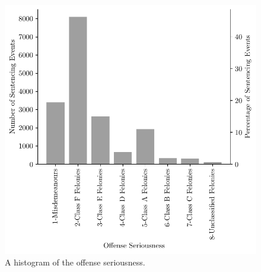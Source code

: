 \documentclass[11pt, oneside]{article}   	%
\theoremstyle{ModifiedStyle}
\begin{document}
\begin{figure}[h!]
	\centering
	\includegraphics[scale=0.75]{Figures/Offense_Seriousness_Histogram}
	\vspace{-2mm}
	\caption{A histogram of the offense seriousness.}
	\label{Figure_Hester_Data_Offense_Seriousness_Histogram}
\end{figure}
%
\end{document}
